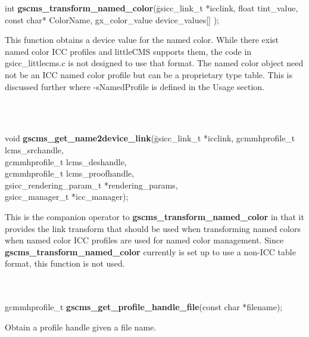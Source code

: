 \documentclass[12pt,notitlepage]{article}
\begin{document}
\begin{tabbing}
\noindent int {\bf gscms\_transform\_named\_color}(\=gsicc\_link\_t *icclink,  float tint\_value, \\
\> const char* ColorName,  gx\_color\_value device\_values[] );\\
\end{tabbing}

\begin{minipage}[h]{6.0in}
 This function obtains a device value for the named color.  While there exist named color ICC profiles and littleCMS supports them, the code in gsicc\_littlecms.c is not designed to use that format.   The named color object need not be an ICC named color profile but can be a proprietary type table. This is discussed further where -sNamedProfile is defined in the Usage section.
\end{minipage}\\
\\

\begin{tabbing}
\noindent void {\bf gscms\_get\_name2device\_link}(\=gsicc\_link\_t *icclink, gcmmhprofile\_t
lcms\_srchandle, \\
\> gcmmhprofile\_t lcms\_deshandle, \\
\> gcmmhprofile\_t lcms\_proofhandle,\\
\> gsicc\_rendering\_param\_t *rendering\_params, \\
\> gsicc\_manager\_t *icc\_manager);\\
\end{tabbing}

\begin{minipage}[h]{6.0in}
This is the companion operator to {\bf gscms\_transform\_named\_color} in that it provides the link transform that should be used when transforming named colors when named color ICC profiles are used for named color management.  Since {\bf gscms\_transform\_named\_color} currently is set up to use a non-ICC table format, this function is not used.
\end{minipage}\\
\\

\noindent gcmmhprofile\_t {\bf gscms\_get\_profile\_handle\_file}(const char *filename);\\

\begin{minipage}[h]{6.0in}
Obtain a profile handle given a file name.
\end{minipage}\\
\\
\end{document}
